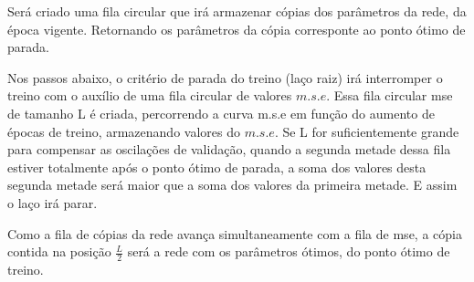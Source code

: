 \documentclass[	12pt, Times, openright, twoside, a4paper, english, brazil]{abntex2}
\begin{document}
            Será criado uma fila circular que irá armazenar cópias dos parâmetros da rede, da época vigente. Retornando os parâmetros da cópia corresponte ao ponto ótimo de parada.

            Nos passos abaixo, o critério de parada do treino (laço raiz) irá interromper o treino com o auxílio de uma fila circular de valores $m.s.e$.
            Essa fila circular mse de tamanho L é criada, percorrendo a curva m.s.e em função do aumento de épocas de treino, armazenando valores do $m.s.e$. Se L for suficientemente grande para compensar as oscilações de validação, quando a segunda metade dessa fila estiver totalmente após o ponto ótimo de parada, a soma dos valores desta segunda metade será maior que a soma dos valores da primeira metade. E assim o laço irá parar.

            Como a fila de cópias da rede avança simultaneamente com a fila de mse, a cópia contida na posição $\frac{L}{2}$ será a rede com os parâmetros ótimos, do ponto ótimo de treino.
\end{document}
